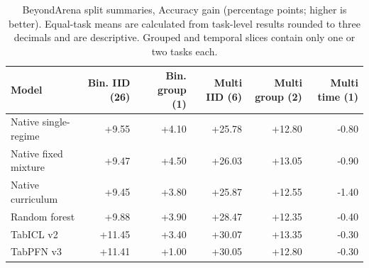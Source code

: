\begin{longtable}{@{}lrrrrr@{}}
\caption{BeyondArena split summaries, Accuracy gain (percentage points; higher is better). Equal-task means are calculated from task-level results rounded to three decimals and are descriptive. Grouped and temporal slices contain only one or two tasks each.}\label{tab:splitacc}\\
\toprule
Model & Bin. IID (26) & Bin. group (1) & Multi IID (6) & Multi group (2) & Multi time (1)\\\midrule
Native single-regime & +9.55 & +4.10 & +25.78 & +12.80 & -0.80\\
Native fixed mixture & +9.47 & +4.50 & +26.03 & +13.05 & -0.90\\
Native curriculum & +9.45 & +3.80 & +25.87 & +12.55 & -1.40\\
Random forest & +9.88 & +3.90 & +28.47 & +12.35 & -0.40\\
TabICL v2 & +11.45 & +3.40 & +30.07 & +13.35 & -0.30\\
TabPFN v3 & +11.41 & +1.00 & +30.05 & +12.80 & -0.30\\
\bottomrule\end{longtable}\endgroup
\begingroup\footnotesize\setlength\LTleft{0pt}\setlength\LTright{0pt}
